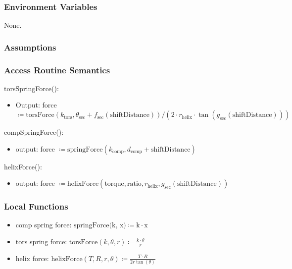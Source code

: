 \documentclass[12pt, titlepage]{article}
\begin{document}
\subsubsection{Environment Variables}
None.

\subsubsection{Assumptions}

\subsubsection{Access Routine Semantics}

\noindent torsSpringForce():
\begin{itemize}
  \item Output: force $\coloneq \text{torsForce} (k_\text{tors}, \theta_\text{sec} + f_\text{sec}(\text{shiftDistance})) / (2 \cdot r_\text{helix} \cdot \tan(g_{\text{sec}}(\text{shiftDistance})))$
\end{itemize}

\noindent compSpringForce():
\begin{itemize}
  \item output: force $\coloneq \text{springForce} (k_\text{comp}, d_\text{comp} + \text{shiftDistance}) $
\end{itemize}

\noindent helixForce():
\begin{itemize}
  \item output: force $\coloneq \text{helixForce} (\text{torque}, \text{ratio}, r_{\text{helix}}, g_{\text{sec}}(\text{shiftDistance}))$
\end{itemize}

\subsubsection{Local Functions}

\begin{itemize}
  \item comp spring force: $\text{springForce(k, x)} \coloneq \text{k} \cdot \text{x}$
  \item tors spring force: $\text{torsForce}(k, \theta, r) \coloneq \frac{k \cdot \theta}{r}$ 
  \item helix force: $\text{helixForce}(T, R, r, \theta) \coloneq \frac{T \cdot R}{2r\tan(\theta)}$
\end{itemize}

\newpage
\end{document}
